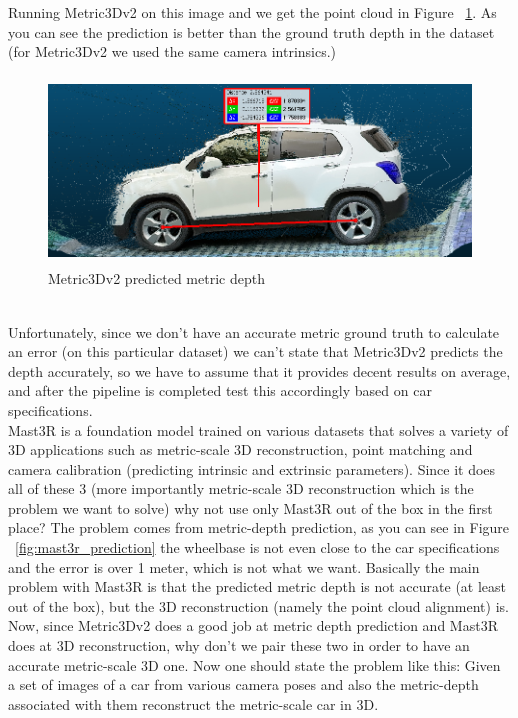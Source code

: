 \documentclass{article}
\begin{document}
\tab \tab Running Metric3Dv2 on this image and we get the point cloud in Figure ~\ref{fig:metric_3d_depth}. As you can see the prediction is better than the ground truth depth in the dataset (for Metric3Dv2 we used the same camera intrinsics.) 
\begin{figure}[!ht]
\includegraphics[width=12cm,height=5cm,keepaspectratio]{images/metric3d_depth.png}
\caption{Metric3Dv2 predicted metric depth}
\label{fig:metric_3d_depth}
\end{figure}\\
\tab \tab Unfortunately, since we don't have an accurate metric ground truth to calculate an error (on this particular dataset) we can't state that Metric3Dv2 predicts the depth accurately, so we have to assume that it provides decent results on average, and after the pipeline is completed test this accordingly based on car specifications.\\
\tab \tab Mast3R \cite{mast3r_arxiv24} is a foundation model trained on various datasets that solves a variety of 3D applications such as metric-scale 3D reconstruction, point matching and camera calibration (predicting intrinsic and extrinsic parameters). Since it does all of these 3 (more importantly metric-scale 3D reconstruction which is the problem we want to solve) why not use only Mast3R out of the box in the first place? The problem comes from metric-depth prediction, as you can see in Figure ~\ref{fig:mast3r_prediction} the wheelbase is not even close to the car specifications and the error is over 1 meter, which is not what we want. Basically the main problem with Mast3R is that the predicted metric depth is not accurate (at least out of the box), but the 3D reconstruction (namely the point cloud alignment) is.
\tab \tab Now, since Metric3Dv2 does a good job at metric depth prediction and Mast3R does at 3D reconstruction, why don't we pair these two in order to have an accurate metric-scale 3D one. Now one should state the problem like this: Given a set of images of a car from various camera poses and also the metric-depth associated with them reconstruct the metric-scale car in 3D.\\
\end{document}
